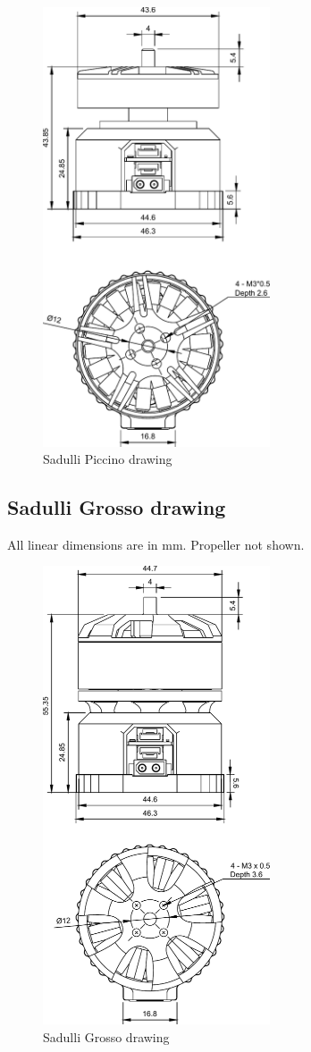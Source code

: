 \begin{figure}[!hbt]
    \centerline{\includegraphics[width=0.6\textwidth]{figures/sadulli_piccino}}
    \caption{Sadulli Piccino drawing}
\end{figure}

\newpage

\subsection{Sadulli Grosso drawing}
All linear dimensions are in mm. Propeller not shown.

\begin{figure}[!hbt]
    \centerline{\includegraphics[width=0.6\textwidth]{figures/sadulli_grosso}}
    \caption{Sadulli Grosso drawing}
\end{figure}

